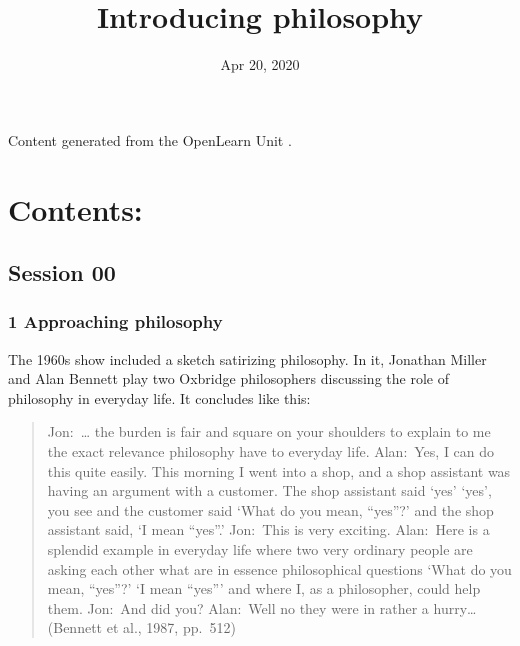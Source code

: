\documentclass[letterpaper,10pt,english]{sphinxmanual}
\title{Introducing philosophy}
\date{Apr 20, 2020}
\author{}
\begin{document}
\pagestyle{empty}
\sphinxmaketitle
\pagestyle{plain}
\sphinxtableofcontents
\pagestyle{normal}
\label{\detokenize{index::doc}}


Content generated from the OpenLearn Unit .


\chapter{Contents:}
\label{\detokenize{index:contents}}

\section{Session 00}
\label{\detokenize{index:session-00}}

\subsection{1 Approaching philosophy}
\label{\detokenize{content/session_00/Part_00_01:1-Approaching-philosophy}}\label{\detokenize{content/session_00/Part_00_01::doc}}
The 1960s show  included a sketch satirizing philosophy. In it, Jonathan Miller and Alan Bennett play two Oxbridge philosophers discussing the role of philosophy in everyday life. It concludes like this:


\begin{quote}

Jon: … the burden is fair and square on your shoulders to explain to me the exact relevance philosophy  have to everyday life. Alan: Yes, I can do this quite easily. This morning I went into a shop, and a shop assistant was having an argument with a customer. The shop assistant said ‘yes’ \textendash{} ‘yes’, you see \textendash{} and the customer said ‘What do you mean, “yes”?’ \textendash{} and the shop assistant said, ‘I mean “yes”.’ Jon: This is very exciting. Alan: Here is a splendid example in everyday life where
two very ordinary people are asking each other what are in essence philosophical questions \textendash{} ‘What do you mean, “yes”?’ \textendash{} ‘I mean “yes”’ \textendash{} and where I, as a philosopher, could help them. Jon: And did you? Alan: Well no \textendash{} they were in rather a hurry… (Bennett et al., 1987, pp. 51\textendash{}2)
\end{quote}
\end{document}
